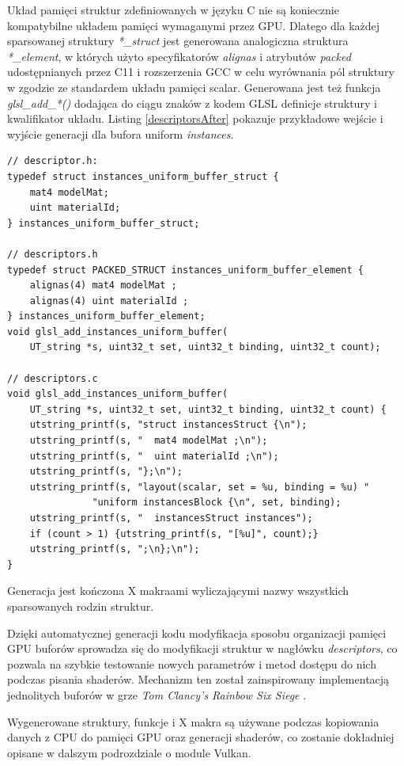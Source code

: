 Układ pamięci struktur zdefiniowanych w języku C nie są koniecznie kompatybilne układem pamięci wymaganymi przez GPU.
Dlatego dla każdej sparsowanej struktury \textit{*\_struct} jest generowana analogiczna struktura \textit{*\_element}, w których użyto specyfikatorów \textit{alignas} i atrybutów \textit{packed} udostępnianych przez C11 i rozszerzenia GCC w celu wyrównania pól struktury w zgodzie ze standardem układu pamięci scalar.
Generowana jest też funkcja \textit{glsl\_add\_*()} dodająca do ciągu znaków z kodem GLSL definicje struktury i kwalifikator układu.
Listing \ref{descriptorsAfter} pokazuje przykładowe wejście i wyjście generacji dla bufora uniform \textit{instances}.
\lstset{language=C}
\begin{lstlisting}[caption={Przykładowe wejście i wyjście generacji dla bufora uniform},captionpos=b,label={descriptorsAfter}]
// descriptor.h:
typedef struct instances_uniform_buffer_struct {
	mat4 modelMat;
	uint materialId;
} instances_uniform_buffer_struct;
	
// descriptors.h
typedef struct PACKED_STRUCT instances_uniform_buffer_element {
	alignas(4) mat4 modelMat ;
	alignas(4) uint materialId ;
} instances_uniform_buffer_element;
void glsl_add_instances_uniform_buffer(
	UT_string *s, uint32_t set, uint32_t binding, uint32_t count);

// descriptors.c
void glsl_add_instances_uniform_buffer(
	UT_string *s, uint32_t set, uint32_t binding, uint32_t count) {
	utstring_printf(s, "struct instancesStruct {\n");
	utstring_printf(s, "  mat4 modelMat ;\n");
	utstring_printf(s, "  uint materialId ;\n");
	utstring_printf(s, "};\n");
	utstring_printf(s, "layout(scalar, set = %u, binding = %u) "
			   "uniform instancesBlock {\n", set, binding);
	utstring_printf(s, "  instancesStruct instances");
	if (count > 1) {utstring_printf(s, "[%u]", count);}
	utstring_printf(s, ";\n};\n");
}
\end{lstlisting}
Generacja jest kończona X makraami wyliczającymi nazwy wszystkich sparsowanych rodzin struktur. 

Dzięki automatycznej generacji kodu modyfikacja sposobu organizacji pamięci GPU buforów sprowadza się do modyfikacji struktur w nagłówku \textit{descriptors}, co pozwala na szybkie testowanie nowych parametrów i metod dostępu do nich podczas pisania shaderów.
Mechanizm ten został zainspirowany implementacją jednolitych buforów w grze \textit{Tom Clancy's Rainbow Six Siege} \cite{RAINBOWSIXSIEGE}.

Wygenerowane struktury, funkcje i X makra są używane podczas kopiowania danych z CPU do pamięci GPU oraz generacji shaderów, co zostanie dokładniej opisane w dalszym podrozdziale o module Vulkan.

